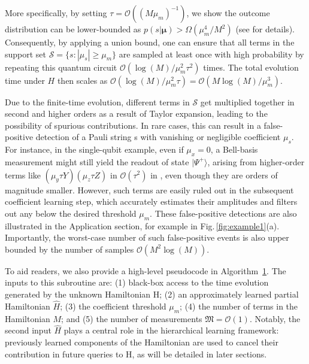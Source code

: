 \documentclass[twocolumn,superscriptaddress,aps,showpacs,amsmath,amstex,amssymb,citeautoscript,floatfix,pra,preprintnumbers]{revtex4-2}
\newcounter{alg}
\theoremstyle{plain}
\theoremstyle{plain}
\theoremstyle{plain}
\theoremstyle{plain}
\theoremstyle{plain}
\theoremstyle{plain}
\newcommand{\figref}[1]{Fig.\,\ref{#1}}
\begin{document}
More specifically, by setting $\tau = \mathcal{O}((M\mu_m)^{-1})$, we show the outcome distribution can be lower-bounded as $p(s|\boldsymbol{\mu}) > \Omega\left(\mu_m^4/M^2\right)$ (see  for details). Consequently, by applying a union bound, one can ensure that all terms in the support set $\mathcal{S}=\{s:|\mu_s|\geq \mu_m\}$ are sampled at least once with high probability by repeating this quantum circuit $\mathcal{O}(\log(M)/\mu_m^2 \tau^2)$ times. The total evolution time under $H$ then scales as $\mathcal{O}(\log(M)/\mu_m^2 \tau)=\mathcal{O}(M\log(M)/\mu_m^3)$. 

Due to the finite-time evolution, different terms in $\mathcal{S}$ get multiplied together in second and higher orders as a result of Taylor expansion, leading to the possibility of spurious contributions. In rare cases, this can result in a false-positive detection of a Pauli string s with vanishing or negligible coefficient $\mu_s$. For instance, in the single-qubit example, even if $\mu_x = 0$, a Bell-basis measurement might still yield the readout of state $|\Psi^{+}\rangle$, arising from higher-order terms like $(\mu_y \tau Y)(\mu_z \tau Z)$ in $\mathcal{O}(\tau^2)$ in , even though they are orders of magnitude smaller. However, such terms are easily ruled out in the subsequent coefficient learning step, which accurately estimates their amplitudes and filters out any below the desired threshold $\mu_m$. These false-positive detections are also illustrated in the Application section, for example in \figref{fig:example1}(a). Importantly, the worst-case number of such false-positive events is also upper bounded by the number of samples $\mathcal{O}(M^2\log(M))$. 

To aid readers, we also provide a high-level pseudocode in Algorithm~\hyperref[alg:algorithm_I]{1}. The inputs to this subroutine are: (1) black-box access to the time evolution generated by the unknown Hamiltonian H; (2) an approximately learned partial Hamiltonian $\hat{H}$; (3) the coefficient threshold $\mu_m$; (4) the number of terms in the Hamiltonian $M$; and (5) the number of measurements $\mathfrak{M} = \mathcal{O}(1)$. Notably, the second input $\hat{H}$ plays a central role in the hierarchical learning framework: previously learned components of the Hamiltonian are used to cancel their contribution in future queries to H, as will be detailed in later sections.
\end{document}

